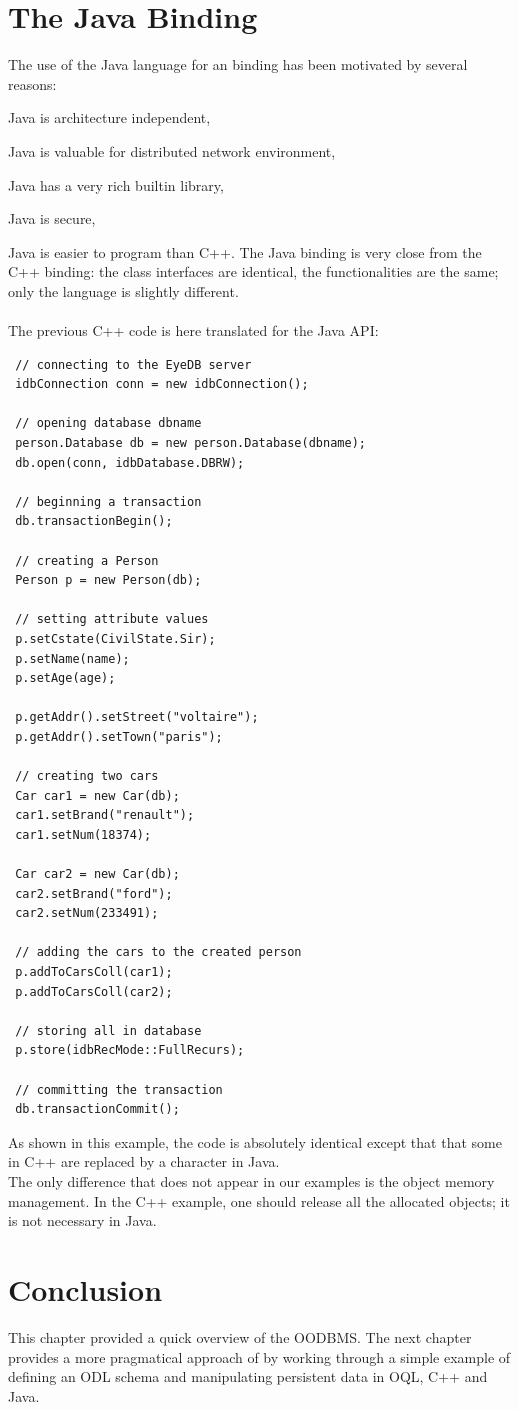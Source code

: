 \section{The Java Binding}
The use of the Java language for an \eyedb binding has been motivated by
several reasons:
\be
\item Java is architecture independent,
\item Java is valuable for distributed network environment,
\item Java has a very rich builtin library,
\item Java is secure,
\item Java is easier to program than C++.
\ee
The Java binding is very close from the C++ binding: the
class interfaces are identical, the functionalities
are the same; only the language is slightly different.
\\
\\
The previous C++ code is here translated for the \eyedb Java API:
{\verbsize
\begin{verbatim}
 // connecting to the EyeDB server
 idbConnection conn = new idbConnection();

 // opening database dbname
 person.Database db = new person.Database(dbname);
 db.open(conn, idbDatabase.DBRW);

 // beginning a transaction
 db.transactionBegin();

 // creating a Person
 Person p = new Person(db);

 // setting attribute values
 p.setCstate(CivilState.Sir);
 p.setName(name);
 p.setAge(age);

 p.getAddr().setStreet("voltaire");
 p.getAddr().setTown("paris");

 // creating two cars
 Car car1 = new Car(db);
 car1.setBrand("renault");
 car1.setNum(18374);

 Car car2 = new Car(db);
 car2.setBrand("ford");
 car2.setNum(233491);

 // adding the cars to the created person
 p.addToCarsColl(car1);
 p.addToCarsColl(car2);

 // storing all in database
 p.store(idbRecMode::FullRecurs);

 // committing the transaction
 db.transactionCommit();
\end{verbatim}
}
As shown in this example, the code is absolutely identical except
that that some \ttv{-$>$} in C++ are replaced by a  character
in Java.
\\
The only difference that does not appear in our examples is the
object memory management. In the C++ example, one should release
all the allocated objects; it is not necessary in Java.
\section{Conclusion}
This chapter provided a quick overview of the \eyedb OODBMS. The next
chapter provides a more pragmatical approach of \eyedb by working through 
a simple
example of defining an ODL schema and manipulating persistent data in OQL,
C++ and Java.



